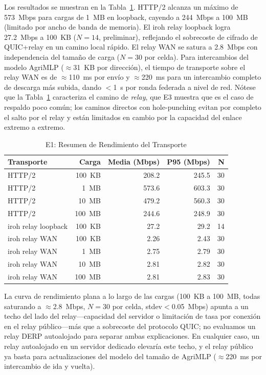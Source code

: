 \documentclass[journal]{IEEEtran}
\begin{document}
Los resultados se muestran en la Tabla~\ref{tab:e1}. HTTP/2 alcanza un máximo de 573~Mbps para cargas de 1~MB en loopback, cayendo a 244~Mbps a 100~MB (limitado por ancho de banda de memoria). El iroh relay loopback logra 27.2~Mbps a 100~KB ($N{=}14$, preliminar), reflejando el sobrecoste de cifrado de QUIC+relay en un camino local rápido. El relay WAN se satura a 2.8~Mbps con independencia del tamaño de carga ($N{=}30$ por celda). Para intercambios del modelo AgriMLP ($\approx$31~KB por dirección), el tiempo de transporte sobre el relay WAN es de $\approx$110~ms por envío y $\approx$220~ms para un intercambio completo de descarga más subida, dando $<$1~s por ronda federada a nivel de red. Nótese que la Tabla~\ref{tab:e1} caracteriza el camino de \emph{relay}, que E3 muestra que es el caso de respaldo poco común; los caminos directos con hole-punching evitan por completo el salto por el relay y están limitados en cambio por la capacidad del enlace extremo a extremo.

\begin{table}[t]
\centering
\caption{E1: Resumen de Rendimiento del Transporte}
\label{tab:e1}
\footnotesize
\begin{tabular}{l r r r r}
\toprule
\textbf{Transporte} & \textbf{Carga} & \textbf{Media (Mbps)} & \textbf{P95 (Mbps)} & \textbf{N} \\
\midrule
HTTP/2               & 100~KB  & 208.2  & 245.5  & 30 \\
HTTP/2               & 1~MB    & 573.6  & 603.3  & 30 \\
HTTP/2               & 10~MB   & 479.2  & 560.3  & 30 \\
HTTP/2               & 100~MB  & 244.6  & 248.9  & 30 \\
\midrule
iroh relay loopback  & 100~KB  & 27.2   & 29.2   & 14 \\
\midrule
iroh relay WAN       & 100~KB  & 2.26   & 2.43   & 30 \\
iroh relay WAN       & 1~MB    & 2.75   & 2.79   & 30 \\
iroh relay WAN       & 10~MB   & 2.81   & 2.82   & 30 \\
iroh relay WAN       & 100~MB  & 2.81   & 2.83   & 30 \\
\bottomrule
\end{tabular}
\end{table}

La curva de rendimiento plana a lo largo de las cargas (100~KB a 100~MB, todas saturando a $\approx$2.8~Mbps, $N{=}30$ por celda, stdev${<}$0.05~Mbps) apunta a un techo del lado del relay---capacidad del servidor o limitación de tasa por conexión en el relay público---más que a sobrecoste del protocolo QUIC; no evaluamos un relay DERP autoalojado para separar ambas explicaciones. En cualquier caso, un relay autoalojado en un servidor dedicado elevaría este techo, y el relay público ya basta para actualizaciones del modelo del tamaño de AgriMLP ($\approx$220~ms por intercambio de ida y vuelta).
\end{document}
